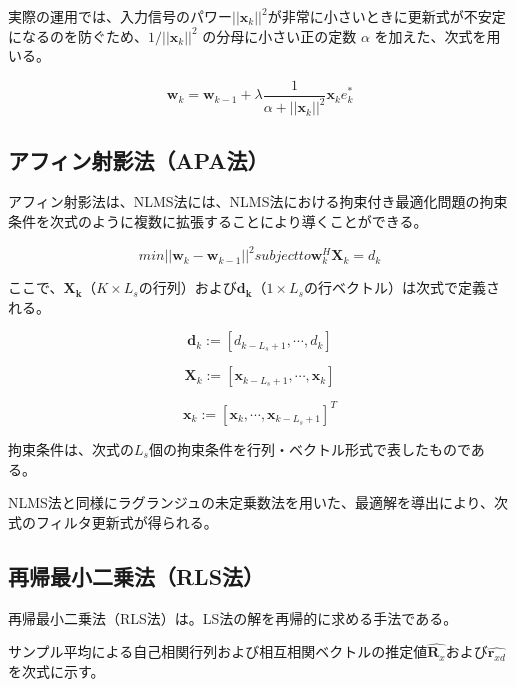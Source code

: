 実際の運用では、入力信号のパワー\(||\bm{x}_k||^2\)が非常に小さいときに更新式が不安定になるのを防ぐため、\(
1 / ||{}\bm{x}_k||^2 \)
の分母に小さい正の定数 \(\alpha\) を加えた、次式を用いる。

\begin{equation}
\bm{w}_k = \bm{w}_{k-1} + \lambda \frac{1}{\alpha + ||\bm{x}_k||^2} \bm{x}_k e_k^*
\end{equation}

\subsection{アフィン射影法（APA法）}\label{apa}

アフィン射影法は、NLMS法には、NLMS法における拘束付き最適化問題の拘束条件を次式のように複数に拡張することにより導くことができる。

\begin{equation}
min ||\bm{w}_k - \bm{w}_{k-1}||^2 subject to \bm{w}_k^H \bm{X}_k = d_k
\end{equation}


ここで、\(\bm{X_k}\)（\(K \times L_s\)の行列）および\(\bm{d_k}\)（\(1 \times L_s\)の行ベクトル）は次式で定義される。


\begin{equation}
\bm{d}_k := [d_{k-L_s+1}, \cdots, d_k]
\end{equation}

\begin{equation}
\bm{X}_k := [\bm{x}_{k-L_s+1}, \cdots, \bm{x}_k]
\end{equation}

\begin{equation}
\bm{x}_k := [\bm{x}_{k}, \cdots, \bm{x}_{k-L_s+1}]^T
\end{equation}

拘束条件は、次式の\(L_s\)個の拘束条件を行列・ベクトル形式で表したものである。

NLMS法と同様にラグランジュの未定乗数法を用いた、最適解を導出により、次式のフィルタ更新式が得られる。

\subsection{再帰最小二乗法（RLS法）}\label{rls}

再帰最小二乗法（RLS法）は。LS法の解を再帰的に求める手法である。

サンプル平均による自己相関行列および相互相関ベクトルの推定値\(\hat{\bm{R}_x}\)および\(\hat{\bm{r}_{xd}}\)を次式に示す。

